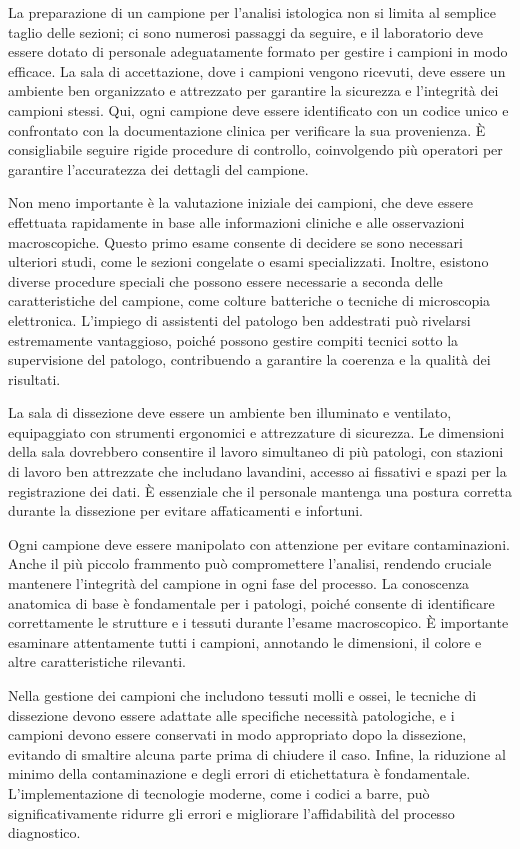 La preparazione di un campione per l'analisi istologica non si limita al semplice taglio delle sezioni; ci sono numerosi passaggi da seguire, e il laboratorio deve essere dotato di personale adeguatamente formato per gestire i campioni in modo efficace. La sala di accettazione, dove i campioni vengono ricevuti, deve essere un ambiente ben organizzato e attrezzato per garantire la sicurezza e l’integrità dei campioni stessi. Qui, ogni campione deve essere identificato con un codice unico e confrontato con la documentazione clinica per verificare la sua provenienza. È consigliabile seguire rigide procedure di controllo, coinvolgendo più operatori per garantire l’accuratezza dei dettagli del campione.

Non meno importante è la valutazione iniziale dei campioni, che deve essere effettuata rapidamente in base alle informazioni cliniche e alle osservazioni macroscopiche. Questo primo esame consente di decidere se sono necessari ulteriori studi, come le sezioni congelate o esami specializzati. Inoltre, esistono diverse procedure speciali che possono essere necessarie a seconda delle caratteristiche del campione, come colture batteriche o tecniche di microscopia elettronica. L’impiego di assistenti del patologo ben addestrati può rivelarsi estremamente vantaggioso, poiché possono gestire compiti tecnici sotto la supervisione del patologo, contribuendo a garantire la coerenza e la qualità dei risultati.

La sala di dissezione deve essere un ambiente ben illuminato e ventilato, equipaggiato con strumenti ergonomici e attrezzature di sicurezza. Le dimensioni della sala dovrebbero consentire il lavoro simultaneo di più patologi, con stazioni di lavoro ben attrezzate che includano lavandini, accesso ai fissativi e spazi per la registrazione dei dati. È essenziale che il personale mantenga una postura corretta durante la dissezione per evitare affaticamenti e infortuni.

Ogni campione deve essere manipolato con attenzione per evitare contaminazioni. Anche il più piccolo frammento può compromettere l’analisi, rendendo cruciale mantenere l'integrità del campione in ogni fase del processo. La conoscenza anatomica di base è fondamentale per i patologi, poiché consente di identificare correttamente le strutture e i tessuti durante l’esame macroscopico. È importante esaminare attentamente tutti i campioni, annotando le dimensioni, il colore e altre caratteristiche rilevanti.

Nella gestione dei campioni che includono tessuti molli e ossei, le tecniche di dissezione devono essere adattate alle specifiche necessità patologiche, e i campioni devono essere conservati in modo appropriato dopo la dissezione, evitando di smaltire alcuna parte prima di chiudere il caso. Infine, la riduzione al minimo della contaminazione e degli errori di etichettatura è fondamentale. L'implementazione di tecnologie moderne, come i codici a barre, può significativamente ridurre gli errori e migliorare l'affidabilità del processo diagnostico.